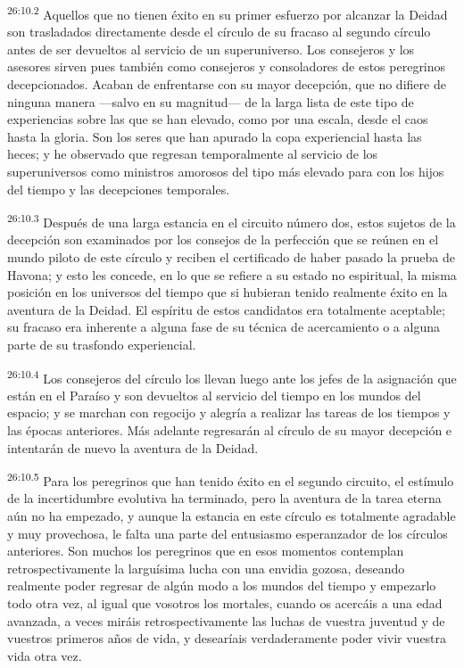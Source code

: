 \par
\textsuperscript{26:10.2} Aquellos que no tienen éxito en su primer esfuerzo por alcanzar la Deidad son trasladados directamente desde el círculo de su fracaso al segundo círculo antes de ser devueltos al servicio de un superuniverso. Los consejeros y los asesores sirven pues también como consejeros y consoladores de estos peregrinos decepcionados. Acaban de enfrentarse con su mayor decepción, que no difiere de ninguna manera ---salvo en su magnitud--- de la larga lista de este tipo de experiencias sobre las que se han elevado, como por una escala, desde el caos hasta la gloria. Son los seres que han apurado la copa experiencial hasta las heces; y he observado que regresan temporalmente al servicio de los superuniversos como ministros amorosos del tipo más elevado para con los hijos del tiempo y las decepciones temporales.

\par
\textsuperscript{26:10.3} Después de una larga estancia en el circuito número dos, estos sujetos de la decepción son examinados por los consejos de la perfección que se reúnen en el mundo piloto de este círculo y reciben el certificado de haber pasado la prueba de Havona; y esto les concede, en lo que se refiere a su estado no espiritual, la misma posición en los universos del tiempo que si hubieran tenido realmente éxito en la aventura de la Deidad. El espíritu de estos candidatos era totalmente aceptable; su fracaso era inherente a alguna fase de su técnica de acercamiento o a alguna parte de su trasfondo experiencial.

\par
\textsuperscript{26:10.4} Los consejeros del círculo los llevan luego ante los jefes de la asignación que están en el Paraíso y son devueltos al servicio del tiempo en los mundos del espacio; y se marchan con regocijo y alegría a realizar las tareas de los tiempos y las épocas anteriores. Más adelante regresarán al círculo de su mayor decepción e intentarán de nuevo la aventura de la Deidad.

\par
\textsuperscript{26:10.5} Para los peregrinos que han tenido éxito en el segundo circuito, el estímulo de la incertidumbre evolutiva ha terminado, pero la aventura de la tarea eterna aún no ha empezado, y aunque la estancia en este círculo es totalmente agradable y muy provechosa, le falta una parte del entusiasmo esperanzador de los círculos anteriores. Son muchos los peregrinos que en esos momentos contemplan retrospectivamente la larguísima lucha con una envidia gozosa, deseando realmente poder regresar de algún modo a los mundos del tiempo y empezarlo todo otra vez, al igual que vosotros los mortales, cuando os acercáis a una edad avanzada, a veces miráis retrospectivamente las luchas de vuestra juventud y de vuestros primeros años de vida, y desearíais verdaderamente poder vivir vuestra vida otra vez.

